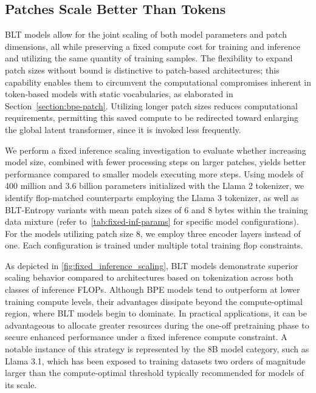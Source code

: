 \subsection{Patches Scale Better Than Tokens} {\textsc BLT} models allow for the joint scaling of both model parameters and patch dimensions, all while preserving a fixed compute cost for training and inference and utilizing the same quantity of training samples. The flexibility to expand patch sizes without bound is distinctive to patch-based architectures; this capability enables them to circumvent the computational compromises inherent in token-based models with static vocabularies, as elaborated in Section~\ref{section:bpe-patch}. Utilizing longer patch sizes reduces computational requirements, permitting this saved compute to be redirected toward enlarging the global latent transformer, since it is invoked less frequently.

We perform a fixed inference scaling investigation to evaluate whether increasing model size, combined with fewer processing steps on larger patches, yields better performance compared to smaller models executing more steps. Using models of 400 million and 3.6 billion parameters initialized with the Llama 2 tokenizer, we identify flop-matched counterparts employing the Llama 3 tokenizer, as well as {\textsc BLT}-Entropy variants with mean patch sizes of 6 and 8 bytes within the training data mixture (refer to~\autoref{tab:fixed-inf-params} for specific model configurations). For the models utilizing patch size 8, we employ three encoder layers instead of one. Each configuration is trained under multiple total training flop constraints.

As depicted in \autoref{fig:fixed_inference_scaling}, {\textsc BLT} models demonstrate superior scaling behavior compared to architectures based on tokenization across both classes of inference FLOPs. Although BPE models tend to outperform at lower training compute levels, their advantages dissipate beyond the compute-optimal region, where {\textsc BLT} models begin to dominate. In practical applications, it can be advantageous to allocate greater resources during the one-off pretraining phase to secure enhanced performance under a fixed inference compute constraint. A notable instance of this strategy is represented by the 8B model category, such as Llama 3.1, which has been exposed to training datasets two orders of magnitude larger than the compute-optimal threshold typically recommended for models of its scale.

